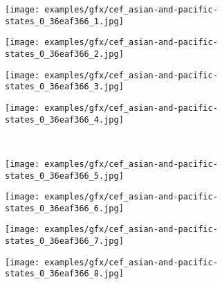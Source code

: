 \begin{figure}[H]
\begin{tcolorbox}[colback=gray!5!white,colframe=black!75!black,fonttitle=\bfseries\scriptsize,fontupper=\ttfamily\footnotesize]
\begin{center}
\begin{minipage}{0.18\linewidth}
      \centering
      \texttt{[image: examples/gfx/cef\_asian-and-pacific-states\_0\_36eaf366\_1.jpg]}
      {\captionsetup{labelformat=empty}}
    \end{minipage}\hfill
    \begin{minipage}{0.18\linewidth}
      \centering
      \texttt{[image: examples/gfx/cef\_asian-and-pacific-states\_0\_36eaf366\_2.jpg]}
      {\captionsetup{labelformat=empty}}
    \end{minipage}\hfill
    \begin{minipage}{0.18\linewidth}
      \centering
      \texttt{[image: examples/gfx/cef\_asian-and-pacific-states\_0\_36eaf366\_3.jpg]}
      {\captionsetup{labelformat=empty}}
    \end{minipage}\hfill
    \begin{minipage}{0.18\linewidth}
      \centering
      \texttt{[image: examples/gfx/cef\_asian-and-pacific-states\_0\_36eaf366\_4.jpg]}
      {\captionsetup{labelformat=empty}}
    \end{minipage}\hfill
  \\[4mm]
    \begin{minipage}{0.18\linewidth}
      \centering
      \texttt{[image: examples/gfx/cef\_asian-and-pacific-states\_0\_36eaf366\_5.jpg]}
      {\captionsetup{labelformat=empty}}
    \end{minipage}\hfill
    \begin{minipage}{0.18\linewidth}
      \centering
      \texttt{[image: examples/gfx/cef\_asian-and-pacific-states\_0\_36eaf366\_6.jpg]}
      {\captionsetup{labelformat=empty}}
    \end{minipage}\hfill
    \begin{minipage}{0.18\linewidth}
      \centering
      \texttt{[image: examples/gfx/cef\_asian-and-pacific-states\_0\_36eaf366\_7.jpg]}
      {\captionsetup{labelformat=empty}}
    \end{minipage}\hfill
    \begin{minipage}{0.18\linewidth}
      \centering
      \texttt{[image: examples/gfx/cef\_asian-and-pacific-states\_0\_36eaf366\_8.jpg]}
      {\captionsetup{labelformat=empty}}
    \end{minipage}\hfill
  \end{center}
\end{tcolorbox}
\end{figure}